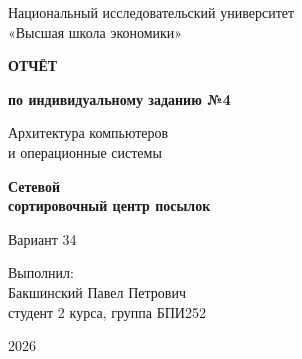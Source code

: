 \documentclass[a4paper,11pt]{article}
\begin{document}
\begin{titlepage}
    \centering
    Национальный исследовательский университет\\[0.4em]
    «Высшая школа экономики»

    \vfill
    \begin{tcolorbox}[myboxstyle,colback=remark_back,colframe=remark_frame,
        boxrule=0.8pt,top=9mm,bottom=9mm]
        \centering
        {\Large\bfseries\color{report_accent} ОТЧЁТ\par}
        \vspace{0.5cm}
        {\large\bfseries по индивидуальному заданию №4\par}
        \vspace{1cm}
        Архитектура компьютеров\\и операционные системы
        \vspace{1cm}

        {\Large\bfseries\color{report_accent} Сетевой\\сортировочный центр посылок\par}
        \vspace{0.5cm}
        {\large Вариант 34\par}
    \end{tcolorbox}

    \vfill
    \begin{flushright}
        Выполнил:\\[0.4em]
        Бакшинский Павел Петрович\\[0.4em]
        студент 2 курса, группа БПИ252
    \end{flushright}
    \vfill
    \materialsbutton
    \par\vspace{0.8cm}
    2026
\end{titlepage}

\pagestyle{plain}
\setcounter{page}{2}
\setlength{\parskip}{1pt}

\end{document}
